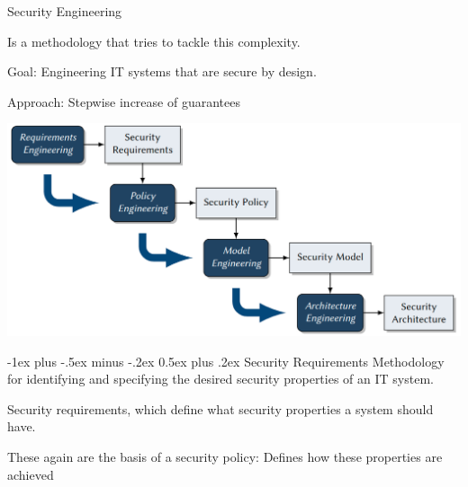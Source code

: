\documentclass[a4paper]{article}
\makeatletter
\renewcommand{\section}{\@startsection{section}{1}{0mm}%
                {-1ex plus -.5ex minus -.2ex}%
                {0.5ex plus .2ex}%
                {\normalfont\large\bfseries}}
\makeatother
\begin{document}
\begin{multicols}{3}
    Security Engineering
    \begin{itemize*}
        \item Is a methodology that tries to tackle this complexity.
        \item Goal: Engineering IT systems that are secure by design.
        \item Approach: Stepwise increase of guarantees
    \end{itemize*}
    \begin{center}
        \includegraphics[width=.7\linewidth]{Assets/Systemsicherheit-engineering-process.png}
    \end{center}

    \section{Security Requirements}
    Methodology for identifying and specifying the desired security properties of an IT system.
    \begin{itemize*}
        \item Security requirements, which define what security properties a system should have.
        \item These again are the basis of a security policy: Defines how these properties are achieved
    \end{itemize*}


\end{multicols}
\end{document}
